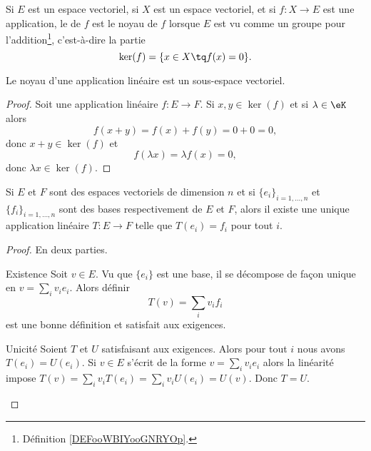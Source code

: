 \begin{definition}
    Si \( E\) est un espace vectoriel, si \( X\) est un espace vectoriel, et si \( f\colon X\to E\) est une application, le  de \( f\) est le noyau de \( f\) lorsque \( E\) est vu comme un groupe pour l'addition\footnote{Définition \ref{DEFooWBIYooGNRYOp}.}, c'est-à-dire la partie
    \begin{equation}
        \ker(f)=\{ x\in X\tq f(x)=0 \}.
    \end{equation}
\end{definition}

\begin{proposition}     \label{PROPooRLLPooKYzsJp}
    Le noyau d'une application linéaire est un sous-espace vectoriel.
\end{proposition}

\begin{proof}
    Soit une application linéaire \( f\colon E\to F\). Si \( x,y\in \ker(f)\) et si \( \lambda\in \eK\) alors
    \begin{equation}
        f(x+y)=f(x)+f(y)=0+0=0,
    \end{equation}
    donc \( x+y\in \ker(f)\) et
    \begin{equation}
        f(\lambda x)=\lambda f(x)=0,
    \end{equation}
    donc \( \lambda x\in \ker(f)\).
\end{proof}

\begin{proposition}
    Si \( E\) et \( F\) sont des espaces vectoriels de dimension \( n\) et si \( \{ e_i \}_{i=1,\ldots, n}\) et \( \{ f_i \}_{i=1,\ldots, n}\) sont des bases respectivement de \( E\) et \( F\), alors il existe une unique application linéaire \( T\colon E\to F\) telle que \( T(e_i)=f_i\) pour tout \( i\).
\end{proposition}

\begin{proof}
    En deux parties.\begin{subproof}
        \item[Existence]
            Soit \( v\in E\). Vu que \( \{ e_i \}\) est une base, il se décompose de façon unique en \( v=\sum_iv_ie_i\). Alors définir
            \begin{equation}
                T(v)=\sum_iv_if_i
            \end{equation}
            est une bonne définition et satisfait aux exigences.
        \item[Unicité]
            Soient \( T\) et \( U\) satisfaisant aux exigences. Alors pour tout \( i\) nous avons \( T(e_i)=U(e_i)\). Si \( v\in E\) s'écrit de la forme \( v=\sum_iv_ie_i\) alors la linéarité impose \( T(v)=\sum_iv_iT(e_i)=\sum_iv_iU(e_i)=U(v)\). Donc \( T = U\).
    \end{subproof}
\end{proof}

